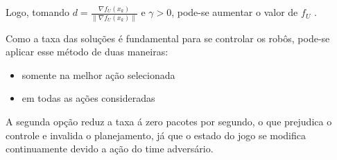 Logo, tomando $d = \frac{\nabla f_U(x_k)}{\lVert \nabla f_U(x_k)\rVert}$ e
$\gamma > 0$, pode-se aumentar o valor de $f_U$ \cite{belegundu2011optimization}.

Como a taxa das soluções é fundamental para se controlar os robôs, pode-se
aplicar esse método de duas maneiras:
\begin{itemize}
  \item somente na melhor ação selecionada
  \item em todas as ações consideradas
\end{itemize}

A segunda opção reduz a taxa á zero pacotes por segundo, o que
prejudica o controle e invalida o planejamento, já que o estado
do jogo se modifica continuamente devido a ação do time adversário.






